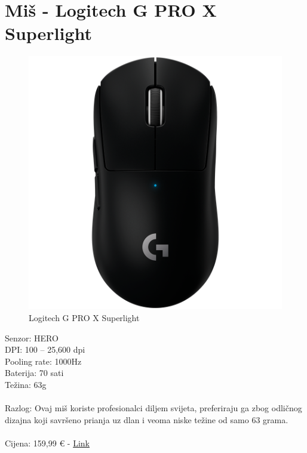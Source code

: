 \documentclass{report}
\begin{document}
\section{Miš - Logitech G PRO X Superlight}
\begin{figure}[H]
    \centering
    \includegraphics[scale=0.23]{miš.png}
    \caption{Logitech G PRO X Superlight}
    \label{fig:mis}
\end{figure}
Senzor: HERO\\DPI: 100 – 25,600 dpi\\Pooling rate: 1000Hz\\Baterija: 70 sati\\Težina: 63g\\\\Razlog: Ovaj miš koriste profesionalci diljem svijeta, preferiraju ga zbog odličnog dizajna koji savršeno prianja uz dlan i veoma niske težine od samo 63 grama.\\\\Cijena: 159,99 € - \href{https://www.links.hr/hr/mis-logitech-pro-x-superlight-bezicni-opticki-25600dpi-bijeli-usb-101500580}{Link}

\pagebreak
\end{document}
